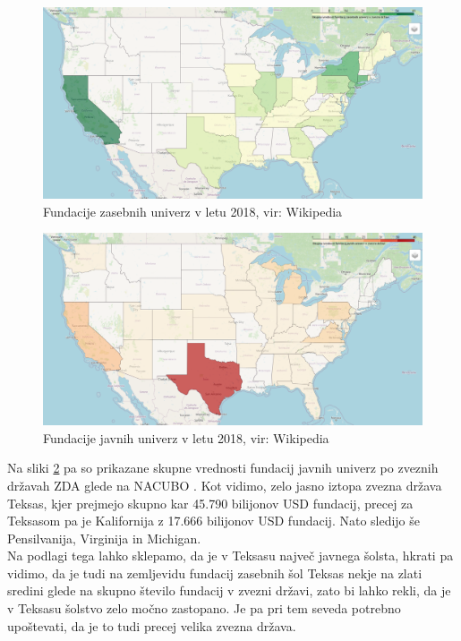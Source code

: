 \documentclass[12pt, a4paper]{article}
\begin{document}
\begin{figure}[!h]
\centering
\includegraphics[width = 15 cm]{grafi_zemljevidi/zemljevid_zasebnih.png}
\caption{Fundacije zasebnih univerz v letu 2018, vir: Wikipedia}
\label{Slika 1}
\end{figure}


\begin{figure}[!h]
\centering
\includegraphics[width = 15 cm]{grafi_zemljevidi/zemljevid_javnih.png}
\caption{Fundacije javnih univerz v letu 2018, vir: Wikipedia}
\label{Slika 2}
\end{figure}

Na sliki \ref{Slika 2} pa so prikazane skupne vrednosti fundacij javnih univerz po zveznih državah ZDA glede na NACUBO \cite{wiki}. Kot vidimo, zelo jasno iztopa zvezna država Teksas, kjer prejmejo skupno kar 45.790 bilijonov USD fundacij, precej za Teksasom pa je Kalifornija z 17.666 bilijonov USD fundacij. Nato sledijo še Pensilvanija, Virginija in Michigan. \\

Na podlagi tega lahko sklepamo, da je v Teksasu največ javnega šolsta, hkrati pa vidimo, da je tudi na zemljevidu fundacij zasebnih šol Teksas nekje na zlati sredini glede na skupno število fundacij v zvezni državi, zato bi lahko rekli, da je v Teksasu šolstvo zelo močno zastopano. Je pa pri tem seveda potrebno upoštevati, da je to tudi precej velika zvezna država. \\
\end{document}
